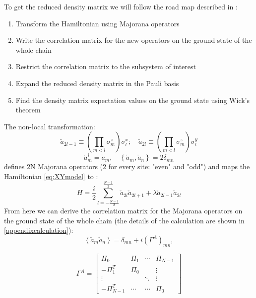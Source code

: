\documentclass[12pt,a4paper]{book}
\theoremstyle{definition}
\begin{document}
	To get the reduced density matrix we will follow the road map described in \cite{latorre2003ground}:
\begin{enumerate}
	\item Transform the Hamiltonian using Majorana operators
	\item Write the correlation matrix for the new operators on the ground state of the whole chain
	\item Restrict the correlation matrix to the subsystem of interest
	\item Expand the reduced density matrix in the Pauli basis
	\item Find the density matrix expectation values on the ground state using Wick's theorem 
\end{enumerate}


The non-local transformation:
\begin{equation}\label{eq:majorana}
	\check{a}_{2 l-1} \equiv\left(\prod_{m<l} \sigma_{m}^{z}\right) \sigma_{l}^{x} ; \quad
	\check{a}_{2 l} \equiv\left(\prod_{m<l} \sigma_{m}^{z}\right) \sigma_{l}^{y}
\end{equation}
\begin{equation}\label{eq:anticomm}
	\check{a}_{m}^{\dagger}=\check{a}_{m}, \quad\left\{\check{a}_{m}, \check{a}_{n}\right\}=2 \delta_{m n}\end{equation}
defines 2N Majorana operators (2 for every site: "even" and "odd") and maps the Hamiltonian \ref{eq:XYmodel} to :
\begin{equation}\label{eq:hamiltwitha}
	H =\frac{i}{2} \sum_{l=-\frac{N-1}{2}}^{\frac{N-1}{2}} \check{a}_{2 l} \check{a}_{2 l+1}  
	+ \lambda \check{a}_{2 l-1} \check{a}_{2 l}
\end{equation}
From here we can derive the correlation matrix for the Majorana operators on the ground state of the whole chain (the details of the calculation are shown in \ref{appendixcalculation}):
\begin{equation}\label{eq:corrmatr1}
	\left\langle\check{a}_{m} \check{a}_{n}\right\rangle=\delta_{m n}+i\left(\Gamma^{A}\right)_{m n}, 
\end{equation}

\begin{equation}\label{eq:corrmatr2}
	\Gamma^{A}=\left[\begin{array}{cccc}
		\Pi_{0} & \Pi_{1} & \cdots & \Pi_{N-1} \\
		-\Pi_{1}^T & \Pi_{0} & & \vdots \\
		\vdots & & \ddots & \vdots \\
		-\Pi_{N-1}^T & \cdots & \cdots & \Pi_{0}
	\end{array}\right]\end{equation}
\end{document}
